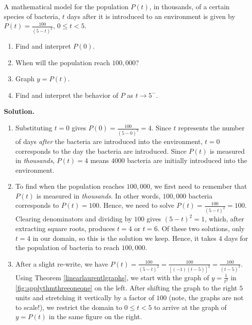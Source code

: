 \begin{ex}  \label{doomsdaypopex} A mathematical model for the population $P(t)$, in thousands, of a certain species of bacteria, $t$ days after it is introduced to an environment is given by $P(t) = \frac{100}{(5-t)^{2}}$, $0 \leq t < 5$.


\begin{enumerate}

\item  Find and interpret $P(0)$.

\item  When will the population reach $100,\!000$?

\item  Graph $y = P(t)$.  

\item  Find and interpret the behavior of $P$ as $t \rightarrow 5^{-}$.  

\end{enumerate}

{ \bf Solution.}  

\begin{enumerate}

\item  Substituting $t=0$ gives $P(0) = \frac{100}{(5-0)^2} = 4$.  Since $t$ represents the number of days \textit{after} the bacteria are introduced into the environment, $t =0$ corresponds to the day the bacteria are introduced.  Since $P(t)$ is measured in \textit{thousands}, $P(t) = 4$  means $4000$ bacteria are initially introduced into the environment.

\item  To find when the population reaches $100,\! 000$, we first need to remember that $P(t)$ is measured in \textit{thousands}.  In other words, $100,\! 000$ bacteria corresponds to $P(t) = 100$.  Hence, we need to solve  $P(t) = \frac{100}{(5-t)^2} = 100$.  Clearing denominators and dividing by $100$ gives $(5-t)^2=1$, which, after extracting square roots, produces $t = 4$ or $t=6$.  Of these two solutions, only $t=4$ in our domain, so this is the solution we keep.  Hence, it takes $4$ days for the population of bacteria to reach $100,\! 000$.

\item After a slight re-write, we have $P(t) = \frac{100}{(5-t)^2} = \frac{100}{[(-1)(t-5)]^2} = \frac{100}{(t-5)^2}$.  Using Theorem \ref{linearlaurentlgraphs}, we start with the graph of $y = \frac{1}{t^2}$ in \autoref{fig:applythmthreeoneone} on the left.  After shifting the graph to the right $5$ units and stretching it vertically by a factor of $100$ (note, the graphs are not to scale!), we restrict the domain to  $0 \leq t < 5$ to arrive at the graph of $y = P(t)$ in the same figure on the right.


\end{enumerate}
\end{ex}
